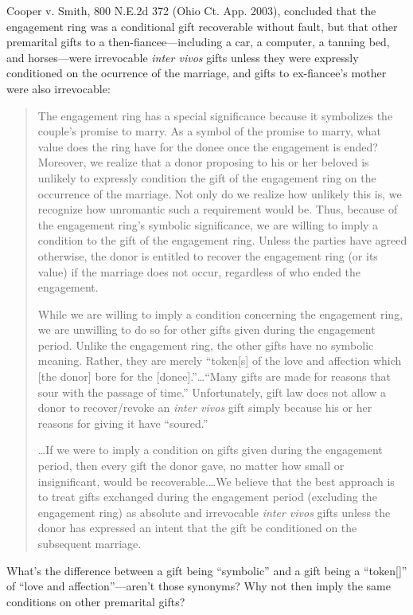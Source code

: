 \item Cooper v. Smith, 800 N.E.2d 372 (Ohio Ct. App. 2003), concluded that the
engagement ring was a conditional gift recoverable without fault, but that
other premarital gifts to a then-fiancee---including a car, a computer, a
tanning bed, and horses---were irrevocable \textit{inter vivos} gifts unless
they were expressly conditioned on the ocurrence of the marriage, and gifts to
ex-fiancee's mother were also irrevocable: 
\begin{quotation}
The engagement ring has a special significance because it symbolizes the
couple's promise to marry. As a symbol of the promise to marry, what value does
the ring have for the donee once the engagement is ended? Moreover, we
realize that a donor proposing to his or her beloved is unlikely to expressly
condition the gift of the engagement ring on the occurrence of the marriage.
Not only do we realize how unlikely this is, we recognize how unromantic such a
requirement would be. Thus, because of the engagement ring's symbolic
significance, we are willing to imply a condition to the gift of the engagement
ring. Unless the parties have agreed otherwise, the donor is entitled to
recover the engagement ring (or its value) if the marriage does not occur,
regardless of who ended the engagement.

While we are willing to imply a condition concerning the engagement ring, we are
unwilling to do so for other gifts given during the engagement period. Unlike
the engagement ring, the other gifts have no symbolic meaning. Rather, they are
merely ``token[s] of the love and affection which [the donor] bore for the
[donee].''\dots ``Many gifts are made for reasons that sour with the passage
of time.'' Unfortunately, gift law does not allow a donor to recover/revoke an
\textit{inter vivos} gift simply because his or her reasons for giving it have
``soured.''

\dots If we were to imply a condition on gifts given during the engagement
period, then every gift the donor gave, no matter how small or insignificant,
would be recoverable.\dots We believe that the best approach is to treat
gifts exchanged during the engagement period (excluding the engagement ring) as
absolute and irrevocable \textit{inter vivos} gifts unless the donor has
expressed an intent that the gift be conditioned on the subsequent marriage.
\end{quotation}
What's the difference between a gift being ``symbolic'' and a gift being a
``token[]'' of ``love and affection''---aren't those synonyms?  Why not then
imply the same conditions on other premarital gifts?

